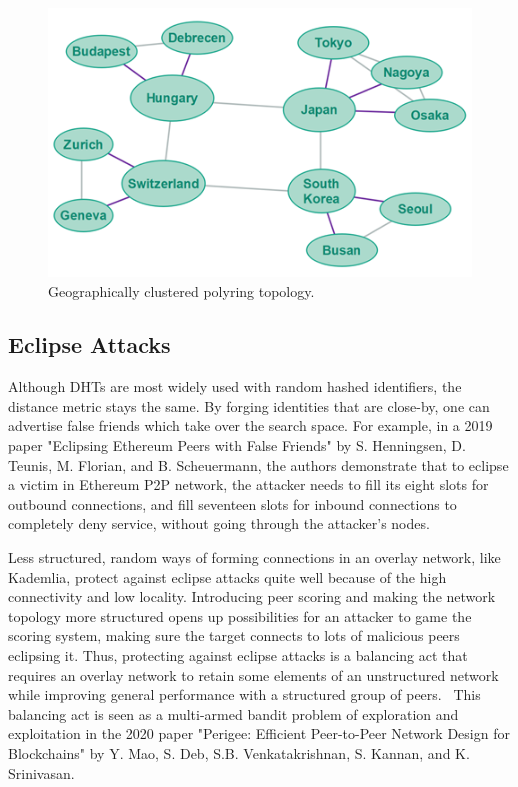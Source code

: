 \begin{figure}
	\includegraphics[width=\textwidth]{pictures/geographical-polyring.png}
	\caption{Geographically clustered polyring topology.\cite{Jenkov_undated-kl}}
	\label{Geographical Polyring}
\end{figure}


\subsection{Eclipse Attacks}
Although DHTs are most widely used with random hashed identifiers, the distance metric stays the same. By forging identities that are close-by, one can advertise false friends which take over the search space. For example, in a 2019 paper "Eclipsing Ethereum Peers with False Friends" by S. Henningsen, D. Teunis, M. Florian, and B. Scheuermann, the authors demonstrate that to eclipse a victim in Ethereum P2P network, the attacker needs to fill its eight slots for outbound connections, and fill seventeen slots for inbound connections to completely deny service, without going through the attacker's nodes.~\cite{Henningsen2019-mf}

Less structured, random ways of forming connections in an overlay network, like Kademlia, protect against eclipse attacks quite well because of the high connectivity and low locality. Introducing peer scoring and making the network topology more structured opens up possibilities for an attacker to game the scoring system, making sure the target connects to lots of malicious peers eclipsing it. Thus, protecting against eclipse attacks is a balancing act that requires an overlay network to retain some elements of an unstructured network while improving general performance with a structured group of peers.~\cite{Mao2020-ee} This balancing act is seen as a multi-armed bandit problem of exploration and exploitation in the 2020 paper "Perigee: Efficient Peer-to-Peer Network Design for Blockchains" by Y. Mao, S. Deb, S.B. Venkatakrishnan, S. Kannan, and K. Srinivasan.

